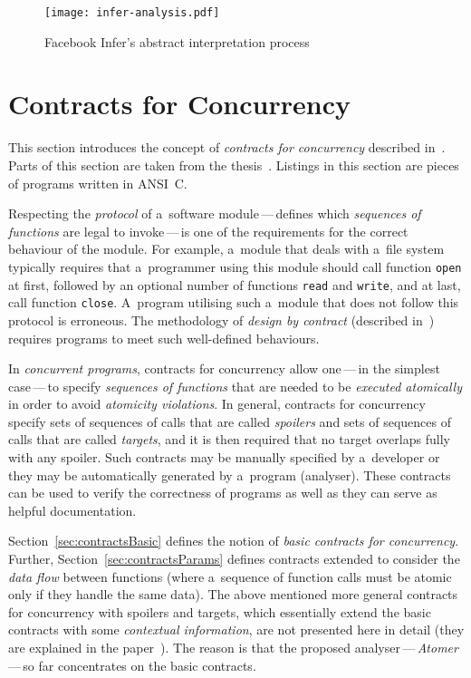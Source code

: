 \begin{figure}[hbt]
    \centering
    \texttt{[image: infer-analysis.pdf]}
    \caption{%
        Facebook Infer's abstract interpretation
        process~\cite{inferAISpeech, harmimBP}
    }
    \label{fig:inferAnalysis}
\end{figure}


\section{Contracts for Concurrency}
\label{sec:contracts}


This section introduces the concept of \emph{contracts for concurrency}
described in~\cite{contracts2015, contracts2017}. Parts of this section are
taken from the thesis~\cite{harmimBP}. Listings in this section are
pieces of programs written in ANSI~C.

Respecting the \emph{protocol} of a~software module\,---\,defines
which \emph{sequences of functions} are legal to invoke\,---\,is one of the
requirements for the correct behaviour of the module. For example, a~module
that deals with a~file system typically requires that a~programmer using
this module should call function \texttt{open} at first, followed by an
optional number of functions \texttt{read} and \texttt{write}, and at last,
call function \texttt{close}. A~program utilising such a~module that does
not follow this protocol is erroneous. The methodology of \emph{design by
contract} (described in~\cite{contract}) requires programs to meet
such well-defined behaviours.~\cite{contracts2015}

In \emph{concurrent programs}, contracts for concurrency allow
one\,---\,in the simplest case\,---\,to specify \emph{sequences of
functions} that are needed to be \emph{executed atomically} in order to
avoid \emph{atomicity violations}. In general, contracts for concurrency
specify sets of sequences of calls that are called \emph{spoilers} and sets
of sequences of calls that are called \emph{targets}, and it is then
required that no target overlaps fully with any spoiler. Such contracts may
be manually specified by a~developer or they may be automatically generated
by a~program (analyser). These contracts can be used to verify the
correctness of programs as well as they can serve as helpful documentation.

Section~\ref{sec:contractsBasic} defines the notion of \emph{basic contracts
for concurrency}. Further, Section~\ref{sec:contractsParams} defines
contracts extended to consider the \emph{data flow} between functions
(where a~sequence of function calls must be atomic only if they handle the
same data). The above mentioned more general contracts for concurrency with
spoilers and targets, which essentially extend the basic contracts with
some \emph{contextual information}, are not presented here in detail
(they are explained in the paper~\cite{contracts2017}). The reason is that
the proposed analyser\,---\,\emph{Atomer}\,---\,so far concentrates on the
basic contracts.

